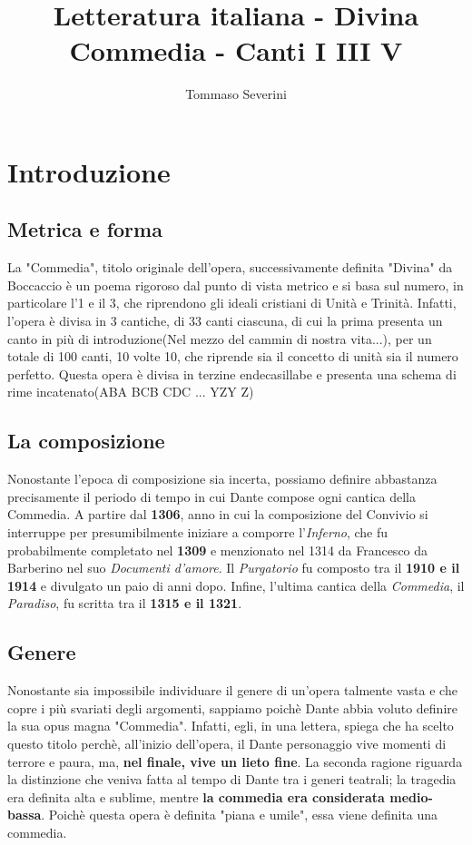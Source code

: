\documentclass[10pt,a4paper]{article}
\author{Tommaso Severini}
\title{Letteratura italiana - Divina Commedia - Canti I III V}
\begin{document}
	\maketitle
	
	\section{Introduzione}
	
	\subsection{Metrica e forma}
	
	La "Commedia", titolo originale dell'opera, successivamente definita "Divina" da Boccaccio è un poema rigoroso dal punto di vista metrico e si basa sul numero, in particolare l'1 e il 3, che riprendono gli ideali cristiani di Unità e Trinità. Infatti, l'opera è divisa in 3 cantiche, di 33 canti ciascuna, di cui la prima presenta un canto in più di introduzione(Nel mezzo del cammin di nostra vita...), per un totale di 100 canti, 10 volte 10, che riprende sia il concetto di unità sia il numero perfetto. Questa opera è divisa in terzine endecasillabe e presenta una schema di rime incatenato(ABA BCB CDC ... YZY Z) 
	
	\subsection{La composizione}
	
	Nonostante l'epoca di composizione sia incerta, possiamo definire abbastanza precisamente il periodo di tempo in cui Dante compose ogni cantica della Commedia. A partire dal \textbf{1306}, anno in cui la composizione del Convivio si interruppe per presumibilmente iniziare a comporre l'\textit{Inferno}, che fu probabilmente completato nel \textbf{1309} e menzionato nel 1314 da Francesco da Barberino nel suo \textit{Documenti d'amore}. Il \textit{Purgatorio} fu composto tra il \textbf{1910 e il 1914} e divulgato un paio di anni dopo. Infine, l'ultima cantica della \textit{Commedia}, il \textit{Paradiso}, fu scritta tra il \textbf{1315 e il 1321}.
	
	\subsection{Genere}
	
	Nonostante sia impossibile individuare il genere di un'opera talmente vasta e che copre i più svariati degli argomenti, sappiamo poichè Dante abbia voluto definire la sua opus magna "Commedia". Infatti, egli, in una lettera, spiega che ha scelto questo titolo perchè, all'inizio dell'opera, il Dante personaggio vive momenti di terrore e paura, ma, \textbf{nel finale, vive un lieto fine}. La seconda ragione riguarda la distinzione che veniva fatta al tempo di Dante tra i generi teatrali; la tragedia era definita alta e sublime, mentre \textbf{la commedia era considerata medio-bassa}. Poichè questa opera è definita "piana e umile", essa viene definita una commedia.
	
\end{document}
